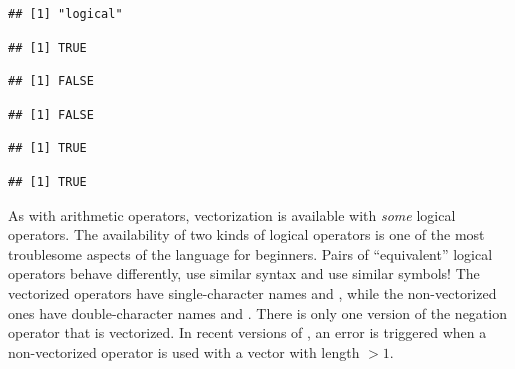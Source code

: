 \documentclass[krantz2]{krantz}\usepackage{knitr}
\begin{document}
\begin{knitrout}\footnotesize
{}\color{fgcolor}\begin{kframe}
\begin{alltt}
 \hlkwb{<-} 
 \hlkwb{<-} 
\end{alltt}
\begin{verbatim}
## [1] "logical"
\end{verbatim}
\begin{alltt}
\end{alltt}
\begin{verbatim}
## [1] TRUE
\end{verbatim}
\begin{alltt}
\hlopt{!} 
\end{alltt}
\begin{verbatim}
## [1] FALSE
\end{verbatim}
\begin{alltt}
 \hlopt{&&}  
\end{alltt}
\begin{verbatim}
## [1] FALSE
\end{verbatim}
\begin{alltt}
 \hlopt{||}  
\end{alltt}
\begin{verbatim}
## [1] TRUE
\end{verbatim}
\begin{alltt}
 
\end{alltt}
\begin{verbatim}
## [1] TRUE
\end{verbatim}
\end{kframe}
\end{knitrout}

As with arithmetic operators, vectorization is available with \emph{some} logical operators. The availability of two kinds of logical operators is one of the most troublesome aspects of the \Rlang language for beginners. Pairs of ``equivalent'' logical operators behave differently, use similar syntax and use similar symbols! The vectorized operators have single-character names \Roperator{\&} and \Roperator{\textbar}, while the non-vectorized ones have double-character names \Roperator{\&\&} and \Roperator{\textbar\textbar}. There is only one version of the negation operator \Roperator{!} that is vectorized. In recent versions of \Rlang, an error is triggered when a non-vectorized operator is used with a vector with length $> 1$.
\end{document}
